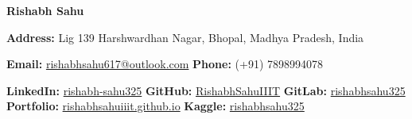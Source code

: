 \documentclass{article}
\begin{document}
\fontsize{11pt}{13pt}\selectfont  %

\begin{center}
	{\Huge \textbf{Rishabh Sahu}} \\ \vspace{3pt}

	{\fontsize{12pt}{12.5pt}\selectfont {}\enspace \textbf{Address:} Lig 139 Harshwardhan Nagar, Bhopal, Madhya Pradesh, India} \\ \vspace{3pt}

	{\fontsize{12pt}{12.5pt}\selectfont
		\enspace \textbf{Email:} \href{mailto:rishabhsahu617@outlook.com}{rishabhsahu617@outlook.com}
		\quad \textbullet \quad
		\enspace \textbf{Phone:} (+91) 7898994078
	} \\ \vspace{3pt}

	{\fontsize{12pt}{12.5pt}\selectfont
		\enspace \textbf{LinkedIn:} \href{https://www.linkedin.com/in/rishabh-sahu325}{rishabh-sahu325}
		\quad \textbullet \quad
		\enspace \textbf{GitHub:} \href{https://github.com/RishabhSahuIIIT}{RishabhSahuIIIT}
		\quad \textbullet \quad
		\enspace \textbf{GitLab:} \href{https://gitlab.com/rishabhsahu325}{rishabhsahu325} \\ \vspace{3pt}
		\enspace \textbf{Portfolio:} \href{https://rishabhsahuiiit.github.io/}{rishabhsahuiiit.github.io}
		\quad \textbullet \quad
		\enspace \textbf{Kaggle:} \href{https://www.kaggle.com/rishabhsahu325}{rishabhsahu325}
	}
\end{center}
\end{document}
